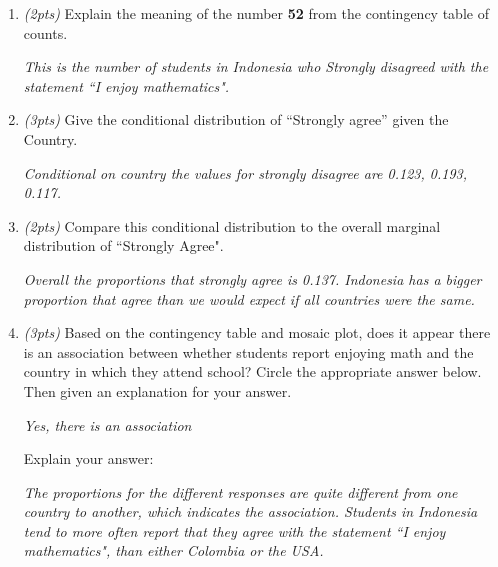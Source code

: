 \documentclass{article}
\begin{document}
\begin{enumerate}
\item {\em (2pts)} Explain the meaning of the number {\bf 52} from the contingency table of counts.

{\em This is the number of students in Indonesia who Strongly disagreed with the statement ``I enjoy mathematics".}

\item {\em (3pts)} Give the conditional distribution of ``Strongly agree'' given the Country. 

{\em Conditional on country the values for strongly disagree are 0.123,  0.193, 0.117.}  

\item {\em (2pts)} Compare this conditional distribution to the overall marginal distribution of ``Strongly Agree". 

{\em Overall the proportions that strongly agree is 0.137. Indonesia has a bigger proportion that agree than we would expect if all countries were the same.}

\item {\em (3pts)} Based on the contingency table and mosaic plot, does it appear there is an association between whether students report enjoying math and the country in which they attend school?  Circle the appropriate answer below.  Then given an explanation for your answer.

{\em Yes, there is an association}

Explain your answer:

{\em The proportions for the different responses are quite different from one country to another, which indicates the association. Students in Indonesia tend to more often report that they agree with the statement ``I enjoy mathematics", than either Colombia or the USA. }

\end{enumerate}
\end{document}
